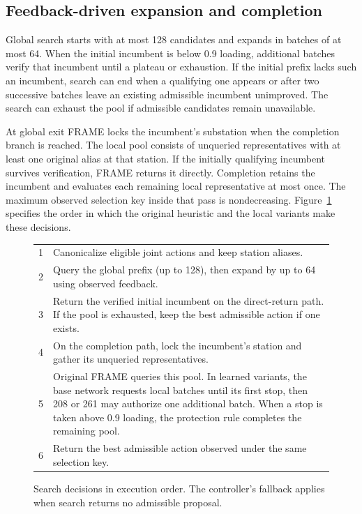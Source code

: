 \documentclass[sigconf,review,anonymous]{acmart}
\begin{document}
\subsection{Feedback-driven expansion and completion}
Global search starts with at most 128 candidates and expands in batches of at most 64. When the initial incumbent is below 0.9 loading, additional batches verify that incumbent until a plateau or exhaustion. If the initial prefix lacks such an incumbent, search can end when a qualifying one appears or after two successive batches leave an existing admissible incumbent unimproved. The search can exhaust the pool if admissible candidates remain unavailable.

At global exit FRAME locks the incumbent's substation when the completion branch is reached. The local pool consists of unqueried representatives with at least one original alias at that station. If the initially qualifying incumbent survives verification, FRAME returns it directly. Completion retains the incumbent and evaluates each remaining local representative at most once. The maximum observed selection key inside that pass is nondecreasing. Figure~\ref{fig:search} specifies the order in which the original heuristic and the local variants make these decisions.

\begin{figure}[t]
\small
\setlength{\tabcolsep}{3pt}
\begin{tabular}{@{}r p{}@{}}
\toprule
1 & Canonicalize eligible joint actions and keep station aliases.\\
2 & Query the global prefix (up to 128), then expand by up to 64 using observed feedback.\\
3 & Return the verified initial incumbent on the direct-return path. If the pool is exhausted, keep the best admissible action if one exists.\\
4 & On the completion path, lock the incumbent's station and gather its unqueried representatives.\\
5 & Original FRAME queries this pool. In learned variants, the base network requests local batches until its first stop, then 208 or 261 may authorize one additional batch. When a stop is taken above 0.9 loading, the protection rule completes the remaining pool.\\
6 & Return the best admissible action observed under the same selection key.\\
\bottomrule
\end{tabular}
\caption{Search decisions in execution order. The controller's fallback applies when search returns no admissible proposal.}
\label{fig:search}
\end{figure}
\end{document}
